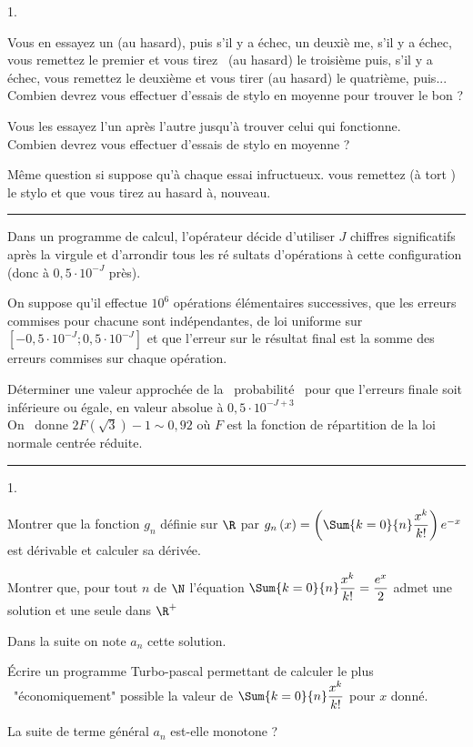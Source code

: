 \documentclass[11pt]{article}%
\begin{document}
\begin{noliste}{1.}
\item Vous en essayez un (au hasard), puis s'il y a échec, un deuxiè%
  me, s'il y a échec, vous remettez le premier et vous tirez \ (au hasard)
  le troisième puis, s'il y a échec, vous remettez le deuxième et
  vous tirer (au hasard) le quatrième, puis...\\
  Combien devrez vous effectuer d'essais de stylo en moyenne pour trouver le
  bon ?

\item Vous les essayez l'un après l'autre jusqu'à trouver celui qui
  fonctionne. \\
  Combien devrez vous effectuer d'essais de stylo en moyenne ?

\item Même question si suppose qu'à chaque essai infructueux. vous
  remettez (à tort ) le stylo et que vous tirez au hasard à, nouveau.
\end{noliste}

\rule{15cm}{0.1cm}

Dans un programme de calcul, l'opérateur décide d'utiliser $J$
chiffres significatifs après la virgule et d'arrondir tous les ré%
sultats d'opérations à cette configuration (donc à $0,5\cdot
10^{-J}$ près).

On suppose qu'il effectue $10^{6}$ opérations élémentaires
successives, que les erreurs commises pour chacune sont indépendantes,
de loi uniforme sur $\left[ -0,5\cdot 10^{-J};0,5\cdot 10^{-J}\right] $ et
que l'erreur sur le résultat final est la somme des erreurs commises sur
chaque opération.

Déterminer une valeur approchée de la \ probabilité \ pour que
l'erreurs finale soit inférieure ou égale, en valeur absolue à $%
0,5\cdot 10^{-J+3}$\\
On \ donne $2F\left( \sqrt{3}\right) -1\sim 0,92$ où $F$ est la
fonction de répartition de la loi normale centrée réduite.


\newpage


\rule{15cm}{0.1cm}


\begin{noliste}{1.}
\item Montrer que la fonction $g_{n}$ définie sur $\R$ par $%
  g_{n}\left( x\right) =\left( \Sum{k=0}{n}\dfrac{x^{k}}{k!}\right) e^{-x}$
  est dérivable et calculer sa dérivée.

\item Montrer que, pour tout $n$ de $\N$ l'équation $%
  \Sum{k=0}{n}\dfrac{x^{k}}{k!}=\dfrac{e^{x}}{2}\ $admet une solution et une
  seule dans $\R^{+}$

  \hspace{-1cm}Dans la suite on note $a_{n}$ cette solution.

\item Écrire un programme Turbo-pascal permettant de calculer le plus
  \ "économiquement" possible la valeur de
  $\Sum{k=0}{n}\dfrac{x^{k}}{k!}$ pour $x$ donné.

\item La suite de terme général $a_{n}$ est-elle monotone ?
\end{noliste}

\end{document}
